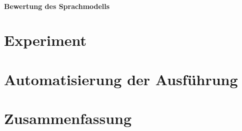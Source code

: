 		\subsubsection{Bewertung des Sprachmodells}
			


\chapter{Experiment}
\label{chapter:Experiment}
		
		   
\chapter{Automatisierung der Ausf\"uhrung}
\label{chapter:auto_ausfuehrung}



\chapter{Zusammenfassung}
\label{chapter:zusammenfassung}

 